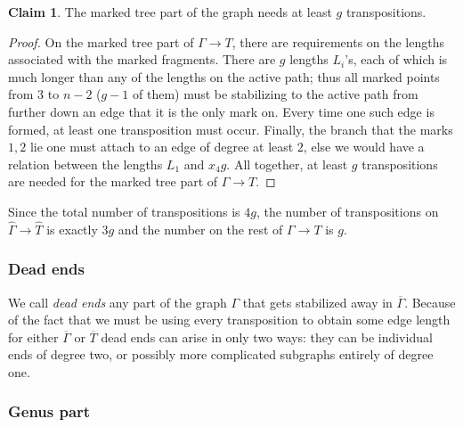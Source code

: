 \documentclass[11pt,reqno]{amsart}
\theoremstyle{definition}
\newtheorem{claim}[theorem]{Claim}
\newcommand{\rcolor}[1]{{\color{blue} #1}}
\newcommand{\gGamma}{\widehat{\Gamma}}
\newcommand{\gT}{\widehat{T}}
\begin{document}
\begin{claim}
    The marked tree part of the graph needs at least $g$ transpositions.
\end{claim}
\begin{proof}
On the marked tree part of $\Gamma \to T$, there are requirements on the lengths associated with the marked fragments. There are $g$ lengths $L_i$'s, each of which is much longer than any of the lengths on the active path; %
thus all marked points  from $3$ to $n-2$ ($g-1$ of them) must be stabilizing to the active path from further down an edge that it is the only mark on. Every time one such edge is formed, at least one transposition must occur. Finally, the branch that the marks $1,2$ lie one must attach to an edge of degree at least $2$, else we would have a relation between the lengths $L_1$ and $x_4g$. All together, at least $g$ transpositions are needed for the marked tree part of $\Gamma \to T$.     
\end{proof}

Since the total number of transpositions is $4g$, the number of transpositions on $\gGamma \to \gT$ is exactly $3g$ and the number on the rest of $\Gamma \to T$ is $g$.

\subsubsection*{Dead ends}
We call {\it dead ends} any part of the graph $\Gamma$ that gets stabilized away in $\overline{\Gamma}$. Because of the fact that we must be using every transposition to obtain some edge length for either $\overline{\Gamma}$ or $\overline{T}$ dead ends can arise in only two ways: they can be individual ends of degree two, or possibly more complicated subgraphs entirely of degree one.

\subsubsection*{Genus part}
\end{document}
